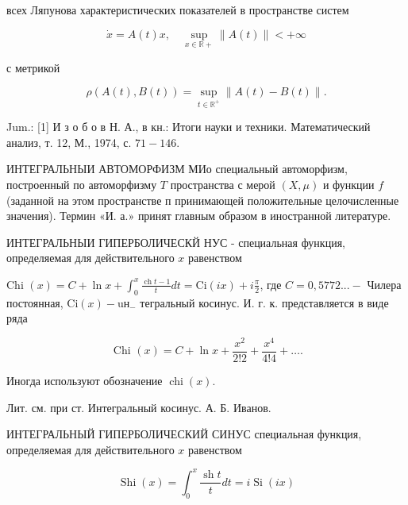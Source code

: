 \documentclass[10pt]{article}
\begin{document}
всех Ляпунова характеристических показателей в пространстве систем



\[

\dot{x}=A(t) x, \quad \sup _{x \in \mathbb{R}+}\|A(t)\|<+\infty

\]



с метрикой



\[

\rho(A(t), B(t))=\sup _{t \in \mathbb{R}^{+}}\|A(t)-B(t)\| .

\]



Jum.: [1] И з о б о в Н. А., в кн.: Итоги науки и техники. Математический анализ, т. 12, М., 1974, с. $71-146$.



ИНТЕГРАЛЬНЫИ АВТОМОРФИЗМ МИо специальный автоморфизм, построенный по автоморфизму $T$ пространства с мерой $(X, \mu)$ и функции $f$ (заданной на этом пространстве п принимающей положительные целочисленные значения). Термин «И. а.» принят главным образом в иностранной литературе.



ИНТЕГРАЛЬНЫИ ГИПЕРБОЛИЧЕСКЙ НУС - специальная функция, определяемая для действительного $x$ равенством



Chi $(x)=C+\ln x+\int_{0}^{x} \frac{\operatorname{ch} t-1}{t} d t=\mathrm{Ci}(i x)+i \frac{\pi}{2}$, где $C=0,5772 . . .-$ Чилера постоянная, $\mathrm{Ci}(x)-\mathrm{uн}_{-}$ тегральный косинус. И. г. к. представляется в виде ряда



\[

\text { Chi }(x)=C+\ln x+\frac{x^{2}}{2 ! 2}+\frac{x^{4}}{4 ! 4}+\ldots .

\]



Иногда используют обозначение $\operatorname{chi}(x)$.



Лит. см. при ст. Интегральный косинус. А. Б. Иванов.



ИНТЕГРАЛЬНЫЙ ГИПЕРБОЛИЧЕСКИЙ СИНУС специальная функция, определяемая для действительного $x$ равенством



\[

\operatorname{Shi}(x)=\int_{0}^{x} \frac{\operatorname{sh} t}{t} d t=i \operatorname{Si}(i x)

\]
\end{document}
